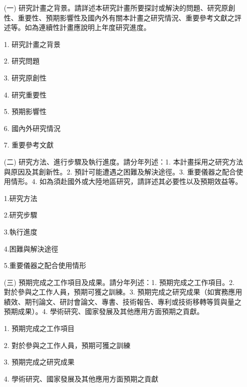 \documentclass[12pt,a4paper]{article}
\begin{document}

\begin{enumerate}
\item[(一)] 研究計畫之背景。請詳述本研究計畫所要探討或解決的問題、研究原創性、重要性、預期影響性及國內外有關本計畫之研究情況、重要參考文獻之評述等。如為連續性計畫應說明上年度研究進度。
\item[] 1. 研究計畫之背景
\item[] 2. 研究問題
\item[] 3. 研究原創性
\item[] 4. 研究重要性
\item[] 5. 預期影響性
\item[] 6. 國內外研究情況
\item[] 7. 重要參考文獻


\item[(二)] 研究方法、進行步驟及執行進度。請分年列述：1. 本計畫採用之研究方法與原因及其創新性。2. 預計可能遭遇之困難及解決途徑。3. 重要儀器之配合使用情形。4. 如為須赴國外或大陸地區研究，請詳述其必要性以及預期效益等。
\item[] 1.研究方法
\item[] 2.研究步驟
\item[] 3.執行進度
\item[] 4.困難與解決途徑
\item[] 5.重要儀器之配合使用情形

\item[(三)] 預期完成之工作項目及成果。請分年列述：1. 預期完成之工作項目。2. 對於參與之工作人員，預期可獲之訓練。3. 預期完成之研究成果（如實務應用績效、期刊論文、研討會論文、專書、技術報告、專利或技術移轉等質與量之預期成果）。4. 學術研究、國家發展及其他應用方面預期之貢獻。
\item[] 1. 預期完成之工作項目
\item[] 2. 對於參與之工作人員，預期可獲之訓練
\item[] 3. 預期完成之研究成果
\item[] 4. 學術研究、國家發展及其他應用方面預期之貢獻

\end{enumerate}	

\label{LastPage}
\end{document}
